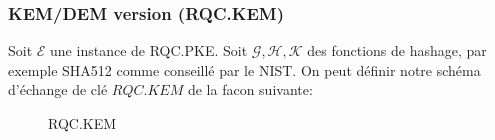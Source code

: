 \documentclass[12pt]{article}
\begin{document}
\subsubsection{KEM/DEM version (RQC.KEM)}
Soit $\mathcal{E}$ une instance de RQC.PKE. Soit $\mathcal{G}, \mathcal{H}, \mathcal{K}$ des fonctions de hashage, par exemple SHA512 comme conseillé par le NIST. On peut définir notre schéma d'échange de clé $RQC.KEM$ de la facon suivante:

\begin{figure}
    \centering
\noindent{}
    \caption{RQC.KEM}
    \label{fig:my_RQC.KEM}
\end{figure}





\newpage
%
%
\end{document}
